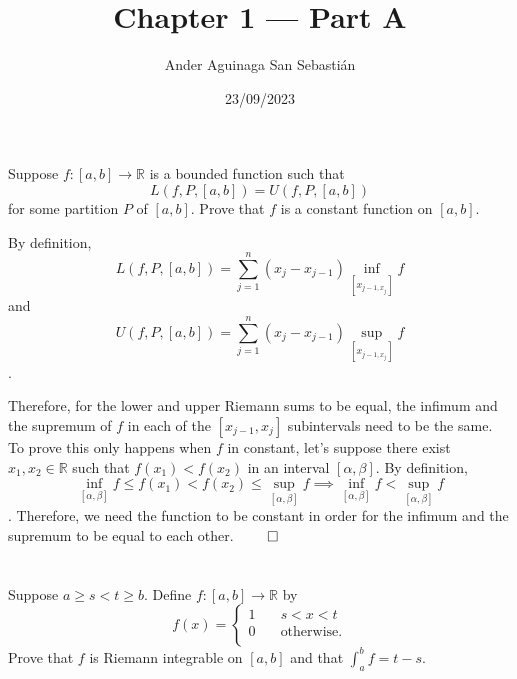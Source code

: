 \documentclass[11pt, a4paper, tikz]{article}
\newcommand{\newpara}{
	\vskip 2mm
}
\newcommand{\centsection}[1]{
	\section*{\centering{#1}}
}
\begin{document}
	\title{\textbf{Chapter 1 — Part A}}
	\author{Ander Aguinaga San Sebastián}
	\date{23/09/2023}
	\maketitle
	\centsection{Exercise 1}
	
	\begin{formulationBox}
		Suppose $f:[a,b]\rightarrow\mathbb{R}$ is a bounded function such that \[L(f,P,[a,b]) = U(f,P,[a,b])\] for some partition $P$ of $[a,b]$. Prove that $f$ is a constant function on $[a,b]$.
	\end{formulationBox}
	
	By definition,
	\begin{equation*}
		L(f, P, [a, b]) = \sum_{j=1}^{n}(x_j-x_{j-1})\inf_{[x_{j-1,x_j}]}f
	\end{equation*}
	and
		\begin{equation*}
		U(f, P, [a, b]) = \sum_{j=1}^{n}(x_j-x_{j-1})\sup_{[x_{j-1,x_j}]}f
	\end{equation*}
	.
	\newpara
	Therefore, for the lower and upper Riemann sums to be equal, the infimum and the supremum of $f$ in each of the $[x_{j-1},x_j]$ subintervals need to be the same. To prove this only happens when $f$ in constant, let's suppose there exist $x_1, x_2\in\mathbb{R}$ such that $f(x_1) < f(x_2)$ in an interval $[\alpha,\beta]$. By definition,
	\begin{equation*}
		\inf_{[\alpha,\beta]}f \leq f(x_1) < f(x_2) \leq  \sup_{[\alpha,\beta]}f \implies \inf_{[\alpha,\beta]}f < \sup_{[\alpha,\beta]}f
	\end{equation*}. Therefore, we need the function to be constant in order for the infimum and the supremum to be equal to each other.
	$\qed$
	
	\centsection{Exercise 2}
	
	\begin{formulationBox}
		Suppose $a\geq s<t\geq b$. Define $f:[a,b]\rightarrow\mathbb{R}$ by
		\[
			f(x) =
			\begin{cases}
				1 &\quad s<x<t\\
				0 &\quad \textrm{otherwise.}\\ 
			\end{cases}
		\]
		Prove that $f$ is Riemann integrable on $[a,b]$ and that $\int_a^bf=t-s$.
	\end{formulationBox}
	
\end{document}
